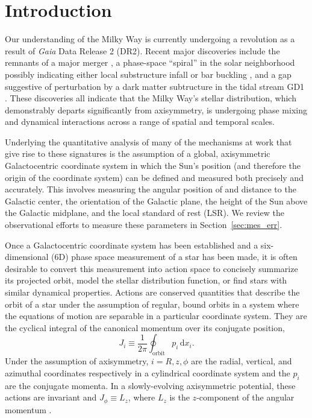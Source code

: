 \documentclass[twocolumn]{aastex62}
\newcommand{\beq}{\begin{equation}}
\newcommand{\eeq}{\end{equation}}
\begin{document}

\section{Introduction} \label{sec:intro}
Our understanding of the Milky Way is currently undergoing a revolution as a
result of {\em Gaia} Data Release 2 (DR2).  Recent major discoveries include
the remnants of a major merger \citep{2018ApJ...860L..11K,
2018Natur.563...85H, 2018arXiv180704290L, 2019MNRAS.482.3426M}, a phase-space
``spiral'' in the solar neighborhood \citep{2018Natur.561..360A} possibly
indicating either local substructure infall \citep{2018MNRAS.481.1501B,
2018arXiv180800451L} or bar buckling \citep{2018arXiv181109205K}, and a gap
suggestive of perturbation by a dark matter subtructure in the tidal stream
GD1 \citep{2018ApJ...863L..20P, 2018arXiv181103631B}. These discoveries all
indicate that the Milky Way's stellar distribution, which demonstrably departs
significantly from axisymmetry, is undergoing phase mixing and dynamical
interactions across a range of spatial and temporal scales.

Underlying the quantitative analysis of many of the mechanisms at work that
give rise to these signatures is the assumption of a global, axisymmetric
Galactocentric coordinate system \citep{2008gady.book.....B} in which the
Sun's position (and therefore the origin of the coordinate system) can be
defined and measured both precisely and accurately. This involves measuring
the angular position of and distance to the Galactic center, the orientation
of the Galactic plane, the height of the Sun above the Galactic midplane, and
the local standard of rest (LSR). We review the observational efforts to
measure these parameters in Section~\ref{sec:mes_err}.

Once a Galactocentric coordinate system has been established and a
six-dimensional (6D) phase space measurement of a star has been made, it is
often desirable to convert this measurement into action space to concisely
summarize its projected orbit, model the stellar distribution function, or
find stars with similar dynamical properties. Actions are conserved quantities
that describe the orbit of a star under the assumption of regular, bound
orbits in a system where the equations of motion are separable in a particular
coordinate system. They are the cyclical integral of the canonical momentum
over its conjugate position,
\beq\label{eq:actions}
J_i \equiv
\frac{1}{2\pi} \oint_{\text{orbit}}p_i\,\text{d}x_i\text{.}
\eeq
Under the assumption of axisymmetry, $i=R,z,\phi$ are the radial, vertical,
and azimuthal coordinates respectively in a cylindrical coordinate system and
the $p_i$ are the conjugate momenta. In a slowly-evolving axisymmetric
potential, these actions are invariant and $J_{\phi} \equiv L_z$, where $L_z$ is the $z$-component of the angular momentum
\citep{2008gady.book.....B,2014RvMP...86....1S}.
\end{document}
